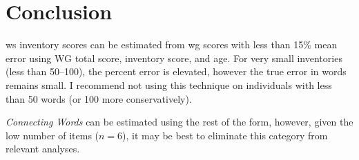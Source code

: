\documentclass[letterpaper]{article}
\newcommand{\cwords}{\textit{Connecting Words}}
\begin{document}
%
%
%
%
%
%

    \section{Conclusion}

    \gls{ws} inventory scores can be estimated from \gls{wg} scores with less
    than 15\% mean error using WG total score, inventory score, and age.  For
    very small inventories (less than 50--100), the percent error is elevated,
    however the true error in words remains small. I recommend not using this
    technique on individuals with less than 50 words (or 100 more
    conservatively).

    \cwords{} can be estimated using the rest of the form, however,
    given the low number of items ($n=6$), it may be best to eliminate this
    category from relevant analyses.
\end{document}
